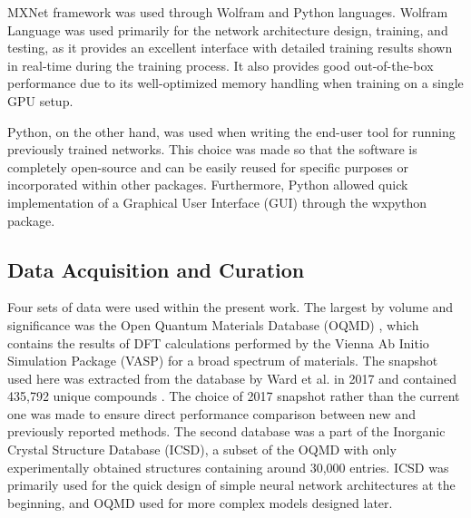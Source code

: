 MXNet framework was used through Wolfram and Python languages. Wolfram Language was used primarily for the network architecture design, training, and testing, as it provides an excellent interface with detailed training results shown in real-time during the training process. It also provides good out-of-the-box performance due to its well-optimized memory handling when training on a single GPU setup. 

Python, on the other hand, was used when writing the end-user tool for running previously trained networks. This choice was made so that the software is completely open-source and can be easily reused for specific purposes or incorporated within other packages. Furthermore, Python allowed quick implementation of a Graphical User Interface (GUI) through the wxpython package.

\subsection{Data Acquisition and Curation} \label{sipfenn:sssec:Data}

Four sets of data were used within the present work. The largest by volume and significance was the Open Quantum Materials Database (OQMD) \cite{Kirklin2015TheEnergies, Saal2013MaterialsOQMD}, which contains the results of DFT calculations performed by the Vienna Ab Initio Simulation Package (VASP) \cite{Kresse1993AbMetals} for a broad spectrum of materials. The snapshot used here was extracted from the database by Ward et al. in 2017 and contained 435,792 unique compounds \cite{Ward2017IncludingTessellations}. The choice of 2017 snapshot rather than the current one was made to ensure direct performance comparison between new and previously reported methods. The second database was a part of the Inorganic Crystal Structure Database (ICSD), a subset of the OQMD with only experimentally obtained structures containing around 30,000 entries. ICSD was primarily used for the quick design of simple neural network architectures at the beginning, and OQMD used for more complex models designed later. 

